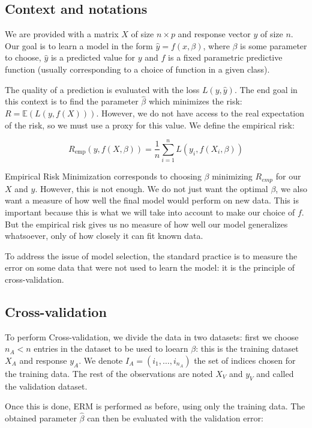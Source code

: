 		\subsection{Context and notations}
We are provided with a matrix $X$ of size $n \times p$ and response vector $y$ of size $n$. Our goal is to learn a model in the form $\hat{y} = f(x, \beta)$, where $\beta$ is some parameter to choose, $\hat{y}$ is a predicted value for $y$ and $f$ is a fixed parametric predictive function (usually corresponding to a choice of function in a given class).

The quality of a prediction is evaluated with the loss $L(y,\hat{y})$. The end goal in this context is to find the parameter $\hat{\beta}$ which minimizes the risk: $R = \mathbb{E}(L(y, f(X)))$. However, we do not have access to the real expectation of the risk, so we must use a proxy for this value. We define the empirical risk:

$$ R_{\text{emp}}(y, f(X, \beta)) = \frac{1}{n} \sum\limits_{i=1}^n L(y_i, f(X_i, \beta))$$

Empirical Risk Minimization corresponds to choosing $\beta$ minimizing $R_{emp}$ for our $X$ and $y$. However, this is not enough. We do not just want the optimal $\beta$, we also want a measure of how well the final model would perform on new data. This is important because this is what we will take into account to make our choice of $f$. But the empirical risk gives us no measure of how well our model generalizes whatsoever, only of how closely it can fit known data.

To address the issue of model selection, the standard practice is to measure the error on some data that were not used to learn the model: it is the principle of cross-validation.

		\subsection{Cross-validation}
To perform Cross-validation, we divide the data in two datasets: first we choose $n_A < n$ entries in the dataset to be used to loearn $\beta$: this is the training dataset $X_A$ and response $y_A$. We denote $I_A = (i_1, \ldots, i_{n_A})$ the set of indices chosen for the training data. The rest of the observations are noted $X_V$ and $y_V$ and called the validation dataset.

Once this is done, ERM is performed as before, using only the training data. The obtained parameter $\hat{\beta}$ can then be evaluated with the validation error:

